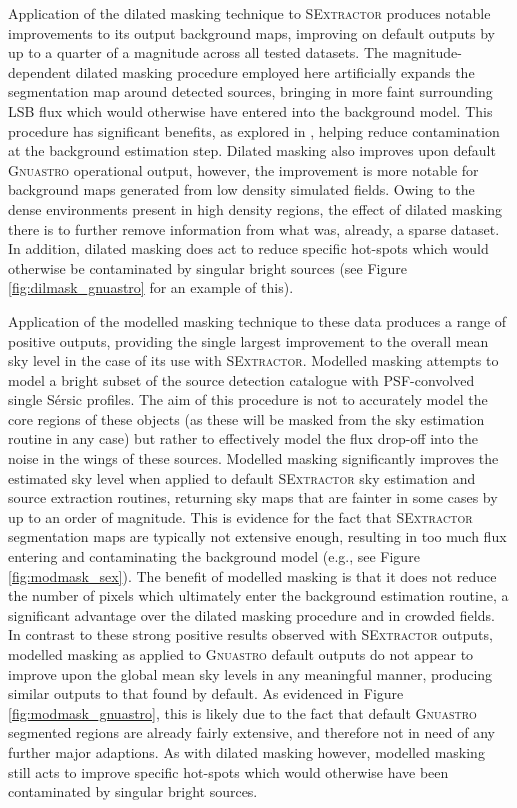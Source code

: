 \documentclass[fleqn,usenatbib,useAMS]{mnras}
\newcommand*{\Sersic}{S\'{e}rsic\xspace}
\newcommand*{\SExtractor}{\textsc{SExtractor}\xspace}
\newcommand*{\Gnuastro}{\textsc{Gnuastro}\xspace}
\begin{document}
Application of the dilated masking technique to \SExtractor produces notable improvements to its output background maps, improving on default outputs by up to a quarter of a magnitude across all tested datasets. The magnitude-dependent dilated masking procedure employed here artificially expands the segmentation map around detected sources, bringing in more faint surrounding LSB flux which would otherwise have entered into the background model. This procedure has significant benefits, as explored in \citet{Ji2018}, helping reduce contamination at the background estimation step. Dilated masking also improves upon default \Gnuastro operational output, however, the improvement is more notable for background maps generated from low density simulated fields. Owing to the dense environments present in high density regions, the effect of dilated masking there is to further remove information from what was, already, a sparse dataset. In addition, dilated masking does act to reduce specific hot-spots which would otherwise be contaminated by singular bright sources (see Figure \ref{fig:dilmask_gnuastro} for an example of this).

Application of the modelled masking technique to these data produces a range of positive outputs, providing the single largest improvement to the overall mean sky level in the case of its use with \SExtractor. Modelled masking attempts to model a bright subset of the source detection catalogue with PSF-convolved single \Sersic profiles. The aim of this procedure is not to accurately model the core regions of these objects (as these will be masked from the sky estimation routine in any case) but rather to effectively model the flux drop-off into the noise in the wings of these sources. Modelled masking significantly improves the estimated sky level when applied to default \SExtractor sky estimation and source extraction routines, returning sky maps that are fainter in some cases by up to an order of magnitude. This is evidence for the fact that \SExtractor segmentation maps are typically not extensive enough, resulting in too much flux entering and contaminating the background model (e.g., see Figure \ref{fig:modmask_sex}). The benefit of modelled masking is that it does not reduce the number of pixels which ultimately enter the background estimation routine, a significant advantage over the dilated masking procedure and in crowded fields. In contrast to these strong positive results observed with \SExtractor outputs, modelled masking as applied to \Gnuastro default outputs do not appear to improve upon the global mean sky levels in any meaningful manner, producing similar outputs to that found by default. As evidenced in Figure \ref{fig:modmask_gnuastro}, this is likely due to the fact that default \Gnuastro segmented regions are already fairly extensive, and therefore not in need of any further major adaptions. As with dilated masking however, modelled masking still acts to improve specific hot-spots which would otherwise have been contaminated by singular bright sources.
\end{document}
